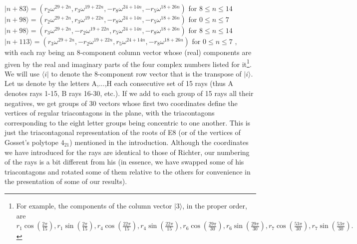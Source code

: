 $|n+83\rangle = (r_{2}\omega^{29+2n},r_{3}\omega^{19+22n},-r_{8}\omega^{24+14n},-r_{5}\omega^{18+26n})$ \hspace{3 mm} for $8\leq n \leq 14$\\
$|n+98\rangle = (r_{2}\omega^{29+2n},r_{3}\omega^{19+22n},-r_{8}\omega^{24+14n},-r_{5}\omega^{18+26n})$ \hspace{3 mm} for $0\leq n \leq 7$\\
$|n+98\rangle = (r_{3}\omega^{29+2n},-r_{2}\omega^{19+22n},r_{5}\omega^{24+14n},-r_{8}\omega^{18+26n})$ \hspace{3 mm} for $8\leq n \leq 14$\\
$|n+113\rangle = (r_{3}\omega^{29+2n},-r_{2}\omega^{19+22n},r_{5}\omega^{24+14n},-r_{8}\omega^{18+26n})$ \hspace{2 mm} for $0\leq n \leq 7$ \hspace{1 mm} ,\\

\noindent
with each ray being an 8-component column vector whose (real) components are given by the real and imaginary parts of the four complex numbers listed for it\footnote{For example, the components of the column vector $|3\rangle$, in the proper order, are $r_{1}\cos(\frac{2\pi}{15}),r_{1}\sin(\frac{2\pi}{15}),r_{4}\cos(\frac{22\pi}{15}),r_{4}\sin(\frac{22\pi}{15}),
r_{6}\cos(\frac{29\pi}{30}),r_{6}\sin(\frac{29\pi}{30}),r_{7}\cos(\frac{53\pi}{30}),r_{7}\sin(\frac{53\pi}{30}).$}. We will use $\langle i |$ to denote the 8-component row vector that is the transpose of $|i\rangle$.\\

Let us denote by the letters A,...,H each consecutive set of 15 rays (thus A denotes rays 1-15, B rays 16-30, etc.). If we add to each group of 15 rays all their negatives, we get groups of 30 vectors whose first two coordinates define the vertices of regular triacontagons in the plane, with the triacontagons corresponding to the eight letter groups being concentric to one another. This is just the triacontagonal representation of the roots of E8 (or of the vertices of Gosset's polytope $4_{21}$) mentioned in the introduction. Although the coordinates we have introduced for the rays are identical to those of Richter\cite{richter}, our numbering of the rays is a bit different from his (in essence, we have swapped some of his triacontagons and rotated some of them relative to the others for convenience in the presentation of some of our results).\\

